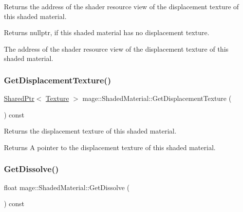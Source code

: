 Returns the address of the shader resource view of the displacement texture of this shaded material.

\begin{DoxyReturn}{Returns}
{\ttfamily nullptr}, if this shaded material has no displacement texture. 

The address of the shader resource view of the displacement texture of this shaded material. 
\end{DoxyReturn}
\hypertarget{structmage_1_1_shaded_material_acf3273d75933ca238075150dd7cc7dca}{}\label{structmage_1_1_shaded_material_acf3273d75933ca238075150dd7cc7dca} 
\subsubsection{\texorpdfstring{Get\+Displacement\+Texture()}{GetDisplacementTexture()}}
{\footnotesize\ttfamily \hyperlink{namespacemage_a1e01ae66713838a7a67d30e44c67703e}{Shared\+Ptr}$<$ \hyperlink{classmage_1_1_texture}{Texture} $>$ mage\+::\+Shaded\+Material\+::\+Get\+Displacement\+Texture (\begin{DoxyParamCaption}{ }\end{DoxyParamCaption}) const\hspace{0.3cm}{\ttfamily [noexcept]}}

Returns the displacement texture of this shaded material.

\begin{DoxyReturn}{Returns}
A pointer to the displacement texture of this shaded material. 
\end{DoxyReturn}
\hypertarget{structmage_1_1_shaded_material_adff98fa9d3ace697033106e04d09ac98}{}\label{structmage_1_1_shaded_material_adff98fa9d3ace697033106e04d09ac98} 
\subsubsection{\texorpdfstring{Get\+Dissolve()}{GetDissolve()}}
{\footnotesize\ttfamily float mage\+::\+Shaded\+Material\+::\+Get\+Dissolve (\begin{DoxyParamCaption}{ }\end{DoxyParamCaption}) const\hspace{0.3cm}{\ttfamily [noexcept]}}

